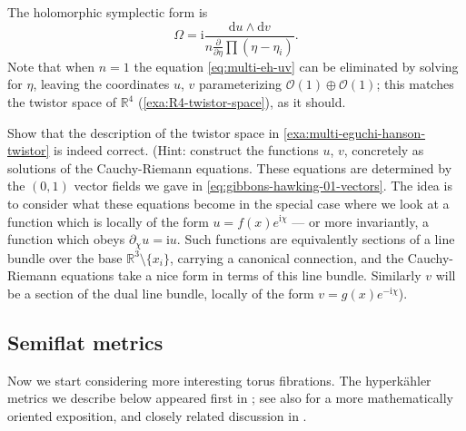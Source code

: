 \documentclass[12pt,letterpaper,reqno]{article}
\numberwithin{equation}{section}
\newcommand{\cO}{\ensuremath{\mathcal O}}
\newcommand{\R}{\ensuremath{\mathbb R}}
\newcommand{\hk}{hyperk\"ahler\xspace}
\newcommand{\I}{{\mathrm i}}
\newcommand{\de}{\mathrm{d}}
\begin{document}
\begin{example}
The holomorphic symplectic form is
\begin{equation}
  \Omega = \I \frac{\de u \wedge \de v}{n \frac{\partial}{\partial \eta} \prod (\eta - \eta_i)}.
\end{equation}
Note that when $n=1$ the equation \eqref{eq:multi-eh-uv} can be
eliminated by solving
for $\eta$, leaving the coordinates $u$, $v$ parameterizing
$\cO(1) \oplus \cO(1)$;
this matches the twistor space of $\R^4$ (\autoref{exa:R4-twistor-space}), 
as it should.
\end{example}

\begin{exercise} Show that the description of the twistor space in \autoref{exa:multi-eguchi-hanson-twistor} is indeed correct. 
(Hint: construct 
the functions $u$, $v$, concretely as solutions of the Cauchy-Riemann equations.
These equations are determined by the $(0,1)$ vector fields we gave 
in \eqref{eq:gibbons-hawking-01-vectors}. The idea is to 
consider what these equations become in the special case where 
we look at a function which is locally of the form $u = f(x) e^{\I \chi}$ ---
or more invariantly, a function which obeys $\partial_\chi u = \I u$.
Such functions are equivalently sections of a line bundle over
the base $\R^3 \setminus \{x_i\}$, carrying a canonical connection,
and the Cauchy-Riemann equations take a nice form in terms of this line
bundle. Similarly $v$ will be a section of the dual line bundle,
locally of the form $v = g(x) e^{-\I \chi}$).
\end{exercise}


\subsection{Semiflat metrics}

Now we start considering more interesting torus fibrations.
The \hk metrics we describe below appeared first in
\cite{Cecotti:1989qn}; see also \cite{Freed:1997dp}
for a more mathematically oriented exposition,
and closely related discussion in \cite{Hitchin:2005uu}.
\end{document}

